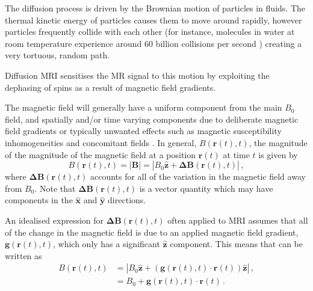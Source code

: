 

The diffusion process is driven by the Brownian motion of particles in fluids.
The thermal kinetic energy of particles causes them to move around rapidly, however particles frequently collide with each other (for instance, molecules in water at room temperature experience around 60 billion collisions per second \cite{Denny1993}) creating a very tortuous, random path.

Diffusion \ac{MRI} sensitises the MR signal to this motion by exploiting the dephasing of spins as a result of magnetic field gradients.


The magnetic field will generally have a uniform component from the main $B_0$ field, and spatially and/or time varying components due to deliberate magnetic field gradients or typically unwanted effects such as magnetic susceptibility inhomogeneities and concomitant fields \cite{Haacke1999}. In general, $B(\mathbf{r}(t), t)$, the magnitude of the magnitude of the magnetic field at a position $\mathbf{r}(t)$ at time $t$ is given by
\begin{equation}
  B(\mathbf{r}(t), t) = |\mathbf{B}| = |B_0\mathbf{\hat{z}} + \mathbf{\Delta B}(\mathbf{r}(t), t)|\,,
  \label{eq:mod_B}
\end{equation}
where $\mathbf{\Delta B}(\mathbf{r}(t), t)$ accounts for all of the variation in the magnetic field away from $B_0$. Note that $\mathbf{\Delta B}(\mathbf{r}(t), t)$ is a vector quantity which may have components in the $\mathbf{\hat{x}}$ and $\mathbf{\hat{y}}$ directions. 

An idealised expression for $\mathbf{\Delta B}(\mathbf{r}(t), t)$ often applied to \ac{MRI} assumes that all of the change in the magnetic field is due to an applied magnetic field gradient, $\mathbf{g}(\mathbf{r}(t), t)$, which only has a significant $\mathbf{\hat{z}}$ component. This means that  can be written as
\begin{align}
  B(\mathbf{r}(t), t) &= \left|B_0\mathbf{\hat{z}} + \left(\mathbf{g}(\mathbf{r}(t), t)\cdot\mathbf{r}(t)\right) \mathbf{\hat{z}}\right|\,,\nonumber \\
                      &= B_0 + \mathbf{g}(\mathbf{r}(t), t)\cdot\mathbf{r}(t)\,.
                        \label{eq:mod_B_ideal}
\end{align}

